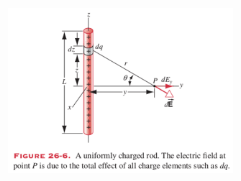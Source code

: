 \documentclass[11pt,letterpaper,boxed]{pset}
\begin{document}
    \begin{figure} [ht]
        \includegraphics[width=225px]{HW1Images/P26-7.png}
        \label{fig:P26-7}
    \end{figure}
    
    \newpage
\end{document}
